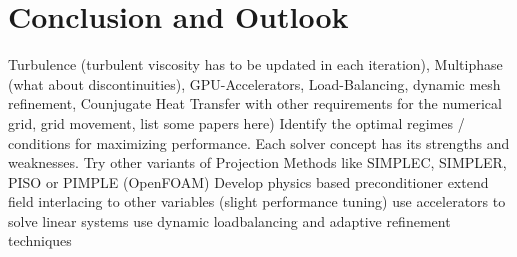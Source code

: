 \section{Conclusion and Outlook}
Turbulence (turbulent viscosity has to be updated in each iteration), Multiphase (what about discontinuities), GPU-Accelerators, Load-Balancing, dynamic mesh refinement, Counjugate Heat Transfer with other requirements for the numerical grid, grid movement, list some papers here)
Identify the optimal regimes / conditions for maximizing performance. Each solver concept has its strengths and weaknesses.
Try other variants of Projection Methods like SIMPLEC, SIMPLER, PISO or PIMPLE (OpenFOAM)
Develop physics based preconditioner
extend field interlacing to other variables (slight performance tuning)
use accelerators to solve linear systems
use dynamic loadbalancing and adaptive refinement techniques

